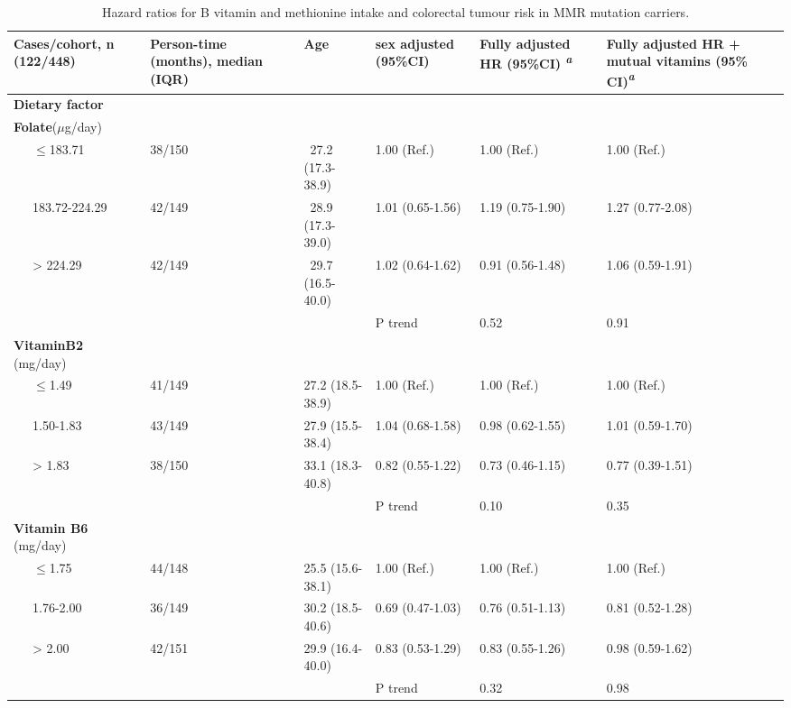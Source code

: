\begin{landscape}
\begin{table}
\small
\caption{Hazard ratios for B vitamin and methionine intake and colorectal tumour risk in MMR mutation carriers.}
\label{table6_2}
\begin{adjustbox}{width=\textwidth}
\begin{tabular}{C{4cm}C{2.5cm}C{3cm}C{3cm}C{3cm}C{3cm}}
\hline 
{\bfseries Cases/cohort, n} (122/448) & \bfseries Person-time (months), median (IQR) & \bfseries Age & sex adjusted (95\%CI) & {\bfseries Fully adjusted HR (95\%CI)} \textit{\textsuperscript{a}} & \textbf{Fully adjusted HR + mutual vitamins (95\% CI)}\textit{\textsuperscript{a}}\\
\hline
\bfseries Dietary factor & ~ & ~ & ~ & ~ & ~ \\
\hline
{\textbf{Folate}}{($\mu$g/day)} & ~ & ~ & ~ & ~ & ~ \\
{\ \ \ }{\textrm{${\leq}$}}{183.71} & 38/150 & \ 27.2 (17.3-38.9) & 1.00 (Ref.) & 1.00 (Ref.) & 1.00 (Ref.)\\
 \ \ \ 183.72-224.29 & 42/149 & \ 28.9 (17.3-39.0) & 1.01 (0.65-1.56) & 1.19 (0.75-1.90) & 1.27 (0.77-2.08)\\
 \ \ \ {\textgreater} 224.29 & 42/149 & \ 29.7 (16.5-40.0) & 1.02 (0.64-1.62) & 0.91 (0.56-1.48) & 1.06 (0.59-1.91)\\ ~ & ~ & ~ & P trend & 0.52 & 0.91\\
\hline
{\textbf{VitaminB2}}{ (mg/day)} & ~ & ~ & ~ & ~ & ~ \\
{\ \ \ }{\textrm{${\leq}$}}{1.49} & 41/149 & 27.2 (18.5-38.9) & 1.00 (Ref.) & 1.00 (Ref.) & 1.00 (Ref.)\\
 \ \ \ 1.50-1.83 & 43/149 & 27.9 (15.5-38.4) & 1.04 (0.68-1.58) & 0.98 (0.62-1.55) & 1.01 (0.59-1.70)\\
 \ \ \ {\textgreater} 1.83 & 38/150 & 33.1 (18.3-40.8) & 0.82 (0.55-1.22) & 0.73 (0.46-1.15) & 0.77 (0.39-1.51)\\ ~ & ~ & ~ & P trend & 0.10 & 0.35\\
\hline
{\textbf{Vitamin B6}}{ (mg/day)} & ~ & ~ & ~ & ~ & ~ \\
{\ \ \ }{\textrm{${\leq}$}}{1.75} & 44/148 & 25.5 (15.6-38.1) & 1.00 (Ref.) & 1.00 (Ref.) & 1.00 (Ref.)\\
 \ \ \ 1.76-2.00 & 36/149 & 30.2 (18.5-40.6) & 0.69 (0.47-1.03) & 0.76 (0.51-1.13) & 0.81 (0.52-1.28)\\
 \ \ \ {\textgreater} 2.00 & 42/151 & 29.9 (16.4-40.0) & 0.83 (0.53-1.29) & 0.83 (0.55-1.26) & 0.98 (0.59-1.62)\\ ~ & ~ & ~ & P trend & 0.32 & 0.98\\

\end{tabular}
\end{adjustbox}
\end{table}
\end{landscape}
